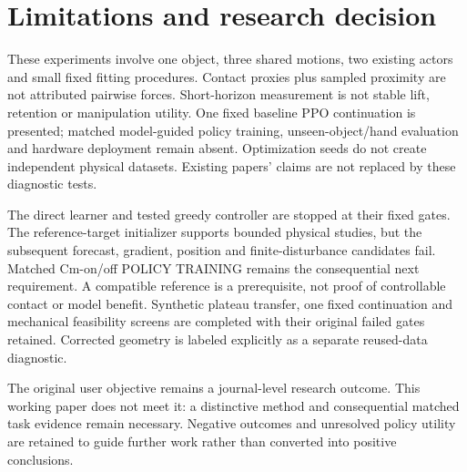 \documentclass[10 pt]{article}
\begin{document}
\section{Limitations and research decision}
These experiments involve one object, three shared motions, two existing actors
and small fixed fitting procedures. Contact proxies plus sampled proximity are
not attributed pairwise forces. Short-horizon measurement is not stable lift,
retention or manipulation utility. One fixed baseline PPO continuation is presented; matched model-guided policy
training, unseen-object/hand evaluation and hardware deployment remain absent. Optimization seeds do not create independent
physical datasets. Existing papers' claims are not replaced by these diagnostic tests.

The direct learner and tested greedy controller are stopped at their fixed gates.
The reference-target initializer supports bounded physical studies, but the
subsequent forecast, gradient, position and finite-disturbance candidates fail.
Matched Cm-on/off POLICY TRAINING remains the consequential next requirement. A compatible reference is a
prerequisite, not proof of controllable contact or model benefit. Synthetic plateau transfer, one fixed continuation and mechanical feasibility
screens are completed with their original failed gates retained. Corrected geometry
is labeled explicitly as a separate reused-data diagnostic.

The original user objective remains a journal-level research outcome. This working
paper does not meet it: a distinctive method and consequential matched task evidence
remain necessary. Negative outcomes and unresolved policy utility are retained
to guide further work rather than converted into positive conclusions.
\end{document}

